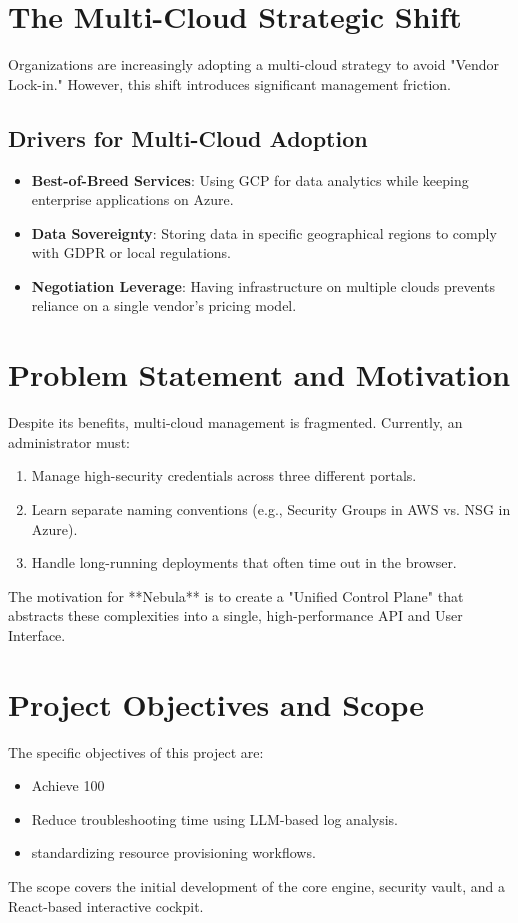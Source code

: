 \section{The Multi-Cloud Strategic Shift}
Organizations are increasingly adopting a multi-cloud strategy to avoid "Vendor Lock-in." However, this shift introduces significant management friction. 

\subsection{Drivers for Multi-Cloud Adoption}
\begin{itemize}
    \item \textbf{Best-of-Breed Services}: Using GCP for data analytics while keeping enterprise applications on Azure.
    \item \textbf{Data Sovereignty}: Storing data in specific geographical regions to comply with GDPR or local regulations.
    \item \textbf{Negotiation Leverage}: Having infrastructure on multiple clouds prevents reliance on a single vendor's pricing model.
\end{itemize}

\section{Problem Statement and Motivation}
Despite its benefits, multi-cloud management is fragmented. Currently, an administrator must:
\begin{enumerate}
    \item Manage high-security credentials across three different portals.
    \item Learn separate naming conventions (e.g., Security Groups in AWS vs. NSG in Azure).
    \item Handle long-running deployments that often time out in the browser.
\end{enumerate}
The motivation for **Nebula** is to create a "Unified Control Plane" that abstracts these complexities into a single, high-performance API and User Interface.

\section{Project Objectives and Scope}
The specific objectives of this project are:
\begin{itemize}
    \item Achieve 100%
    \item Reduce troubleshooting time using LLM-based log analysis.
    \item standardizing resource provisioning workflows.
\end{itemize}
The scope covers the initial development of the core engine, security vault, and a React-based interactive cockpit.

\newpage
